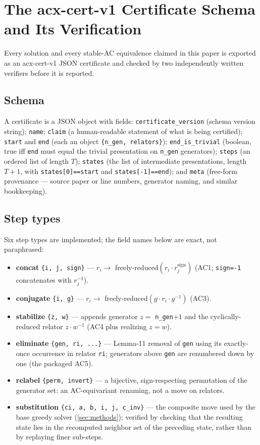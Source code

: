 \section{The acx-cert-v1 Certificate Schema and Its Verification}\label{app:certs}

Every solution and every stable-AC equivalence claimed in this paper is exported as an
acx-cert-v1 JSON certificate and checked by two independently written verifiers before it
is reported.

\subsection{Schema}

A certificate is a JSON object with fields: \texttt{certificate\_version} (schema version
string); \texttt{name}; \texttt{claim} (a human-readable statement of what is being
certified); \texttt{start} and \texttt{end} (each an object \texttt{\{n\_gen, relators\}});
\texttt{end\_is\_trivial} (boolean, true iff \texttt{end} must equal the trivial
presentation on \texttt{n\_gen} generators); \texttt{steps} (an ordered list of length
$T$); \texttt{states} (the list of intermediate presentations, length $T+1$, with
\texttt{states[0]==start} and \texttt{states[-1]==end}); and \texttt{meta} (free-form
provenance --- source paper or line numbers, generator naming, and similar bookkeeping).

\subsection{Step types}

Six step types are implemented; the field names below are exact, not paraphrased:

\begin{itemize}
  \item \textbf{concat} \texttt{\{i, j, sign\}} --- $r_i \to$ freely-reduced$(r_i \cdot
    r_j^{\text{sign}})$ (AC1; \texttt{sign=-1} concatenates with $r_j^{-1}$).
  \item \textbf{conjugate} \texttt{\{i, g\}} --- $r_i \to$ freely-reduced$(g\cdot r_i\cdot
    g^{-1})$ (AC3).
  \item \textbf{stabilize} \texttt{\{z, w\}} --- appends generator $z=$ \texttt{n\_gen}$+1$
    and the cyclically-reduced relator $z\cdot w^{-1}$ (AC4 plus realizing $z=w$).
  \item \textbf{eliminate} \texttt{\{gen, ri, ...\}} --- Lemma-11 removal of \texttt{gen}
    using its exactly-once occurrence in relator \texttt{ri}; generators above \texttt{gen}
    are renumbered down by one (the packaged AC5).
  \item \textbf{relabel} \texttt{\{perm, invert\}} --- a bijective, sign-respecting
    permutation of the generator set: an AC-equivariant renaming, not a move on relators.
  \item \textbf{substitution} \texttt{\{ci, a, b, i, j, c\_inv\}} --- the composite move used
    by the base greedy solver (\ref{sec:methods}); verified by checking that the resulting
    state lies in the recomputed neighbor set of the preceding state, rather than by
    replaying finer sub-steps.
\end{itemize}

